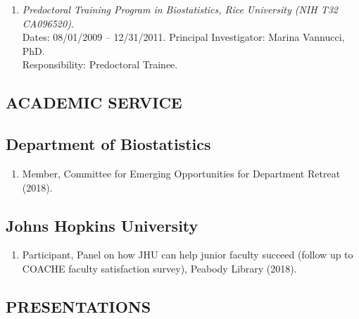 \documentclass[10pt]{article}
\newcommand{\dn}[1]{{\color{black} {#1}}}
\newcommand{\mydot}[1]{\begin{enumerate}[label=$\circ$,leftmargin=\parindent]\setlength{\itemsep}{#1}}
\newcommand{\ee}{\end{enumerate}}
\begin{document}
\mydot{0.3em}

\item
{\it Predoctoral Training Program in Biostatistics, Rice University (NIH T32 CA096520).}\\[0.0em]
\dn{Dates:} 08/01/2009 -- 12/31/2011.
\dn{Principal Investigator:} Marina Vannucci, PhD.\\
\dn{Responsibility:} Predoctoral Trainee.

\ee

\subsection*{ACADEMIC SERVICE}

\smallskip

\subsection*{Department of Biostatistics}

\mydot{-0.1em}

\item Member, Committee for Emerging Opportunities for Department Retreat (2018).

\ee




\subsection*{Johns Hopkins University}
\mydot{-0.1em}

\item Participant, Panel on how JHU can help junior faculty succeed (follow up to COACHE faculty satisfaction survey), Peabody Library (2018).

\ee

\subsection*{PRESENTATIONS}
\end{document}
